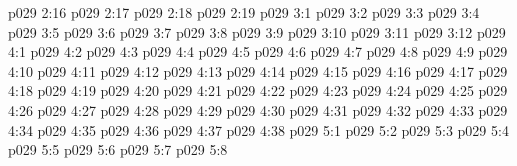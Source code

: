 \vs p029 2:16 
\vs p029 2:17 
\vs p029 2:18 
\vs p029 2:19 
\vs p029 3:1 
\vs p029 3:2 
\vs p029 3:3 
\vs p029 3:4 \pc 
\vs p029 3:5 
\vs p029 3:6 \pc 
\vs p029 3:7 
\vs p029 3:8 
\vs p029 3:9 \pc 
\vs p029 3:10 \pc 
\vs p029 3:11 
\vs p029 3:12 
\vs p029 4:1 
\vs p029 4:2 
\vs p029 4:3 
\vs p029 4:4 \pc 
\vs p029 4:5 
\vs p029 4:6 
\vs p029 4:7 
\vs p029 4:8 
\vs p029 4:9 
\vs p029 4:10 
\vs p029 4:11 
\vs p029 4:12 \pc 
\vs p029 4:13 
\vs p029 4:14 
\vs p029 4:15 
\vs p029 4:16 
\vs p029 4:17 
\vs p029 4:18 
\vs p029 4:19 
\vs p029 4:20 
\vs p029 4:21 
\vs p029 4:22 
\vs p029 4:23 
\vs p029 4:24 
\vs p029 4:25 
\vs p029 4:26 \pc 
\vs p029 4:27 
\vs p029 4:28 
\vs p029 4:29 
\vs p029 4:30 
\vs p029 4:31 
\vs p029 4:32 
\vs p029 4:33 
\vs p029 4:34 
\vs p029 4:35 
\vs p029 4:36 
\vs p029 4:37 
\vs p029 4:38 
\vs p029 5:1 
\vs p029 5:2 
\vs p029 5:3 
\vs p029 5:4 \pc 
\vs p029 5:5 \pc 
\vs p029 5:6 
\vs p029 5:7 
\vsetoff
\vs p029 5:8 
\quizlink
